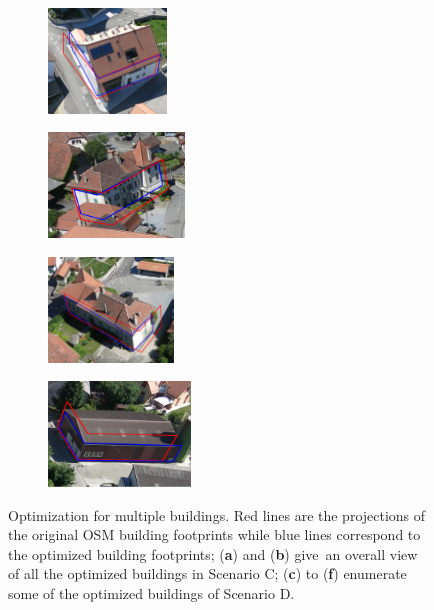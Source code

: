 \begin{figure}[H]
\begin{subfigure}[tbp]{0.48\columnwidth}
           \caption[]{}
           {{\small }}
           \label{fig:7b}
       \end{subfigure}
       \hfill
       \begin{subfigure}[tbp]{0.24\columnwidth}
           \centering
           \includegraphics[height=2.8cm]{optimize/su_both_1.png}
           \caption[]{}
           {{\small }}
           \label{fig:7c}
       \end{subfigure}
       \hfill
       \begin{subfigure}[tbp]{0.24\columnwidth}
           \centering
           \includegraphics[height=2.8cm]{optimize/su_both_2.png}
           \caption[]{}
           {{\small }}
           \label{fig:7d}
       \end{subfigure} 
       \hfill
       \begin{subfigure}[tbp]{0.24\columnwidth}
           \centering
           \includegraphics[height=2.8cm]{optimize/su_both_3.png}
           \caption[]{}
           {{\small }}
           \label{fig:7e}
       \end{subfigure}
       \hfill
       \begin{subfigure}[tbp]{0.24\columnwidth}
           \centering
           \includegraphics[height=2.8cm]{optimize/su_both_4.png}
           \caption[]{}
           {{\small }}
           \label{fig:7f}
       \end{subfigure}         
       \caption{Optimization for multiple buildings. Red lines are the projections of the original OSM building footprints while blue lines correspond to the optimized building footprints; (\textbf{a}) and (\textbf{b}) give~an overall view of all the optimized buildings in Scenario C; (\textbf{c}) to (\textbf{f}) enumerate some of the optimized buildings of Scenario D.}
       
       \label{fig:optimized}
\end{figure}

